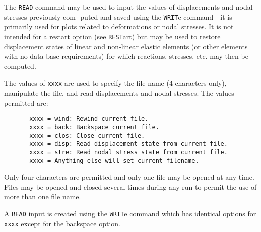 \headb

The {\tt READ} command may be used to input the
values of displacements and nodal stresses previously com-
puted and saved using the {\tt WRIT}e command - it is primarily
used for plots related to deformations or nodal
stresses.  It is not intended for a restart option (see
{\tt REST}art) but may be used to restore displacement states of
linear and non-linear elastic elements (or other elements
with no data base requirements) for which reactions,
stresses, etc. may then be computed.

The values of {\tt xxxx} are used to specify the file name
(4-characters only), manipulate the file, and read displacements
and nodal stresses.  The values permitted are:

\begin{verbatim}
       xxxx = wind: Rewind current file.
       xxxx = back: Backspace current file.
       xxxx = clos: Close current file.
       xxxx = disp: Read displacement state from current file.
       xxxx = stre: Read nodal stress state from current file.
       xxxx = Anything else will set current filename.
\end{verbatim}                   
Only four characters are permitted and only one
file may be opened at any time.  Files may be
opened and closed several times during any run
to permit the use of more than one file name.

A {\tt READ} input is created using the {\tt WRIT}e command
which has identical options for {\tt xxxx} except for the backspace option.
\vfill\eject
